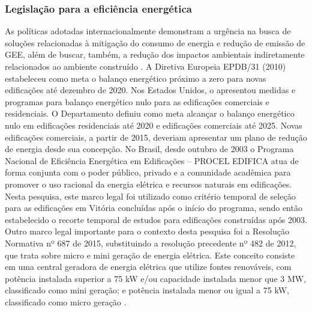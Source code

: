 \begin{onehalfspace}
\subsubsection{Legislação para a eficiência energética}
As políticas adotadas internacionalmente demonstram a urgência na busca de soluções relacionadas 
à mitigação do consumo de energia e redução de emissão de GEE, além de buscar, também, a redução 
dos impactos ambientais indiretamente relacionados ao ambiente construído \cite{InternationalMonetaryFund-IMF2018,InternationalEnergyAgency-IEA2018a}.\vspace{0.3cm} \newline
A Diretiva Europeia EPDB/31 (2010) estabeleceu como meta o balanço energético próximo a zero para 
novas edificações até dezembro de 2020. Nos Estados Unidos, o \textit{\textcite{U.S.DepartmentofEnergy-USDOE2015}}
apresentou medidas e programas para balanço energético nulo para as edificações comerciais e residenciais. 
O Departamento definiu como meta alcançar o balanço energético nulo em edificações residenciais 
até 2020 e edificações comerciais até 2025. Novas edificações comerciais, a partir de 2015, deveriam 
apresentar um plano de redução de energia desde sua concepção.\vspace{0.3cm} \newline
No Brasil, desde outubro de 2003 o Programa Nacional de Eficiência Energética em Edificações – 
PROCEL EDIFICA \cite{Brasil2001,Brasil2001a} atua de forma conjunta com o poder público, privado e a comunidade 
acadêmica para promover o uso racional da energia elétrica e recursos naturais em edificações. 
Nesta pesquisa, este marco legal foi utilizado como critério temporal de seleção para as edificações 
em Vitória concluídas após o início do programa, sendo então estabelecido o recorte temporal de 
estudos para edificações construídas após 2003.\vspace{0.3cm} \newline
Outro marco legal importante para o contexto desta pesquisa foi a Resolução Normativa nº 687 de 2015, 
substituindo a resolução precedente nº 482 de 2012, que trata sobre micro e mini geração de energia 
elétrica. Este conceito consiste em uma central geradora de energia elétrica que utilize fontes 
renováveis, com potência instalada superior a 75 kW e/ou capacidade instalada menor que 3 MW, 
classificado como mini geração; e potência instalada menor ou igual a 75 kW, classificado como 
micro geração \cite{AgenciaNacionaldeEnergiaEletricaANEEL2015}.\vspace{0.3cm} \newline

\end{onehalfspace}
